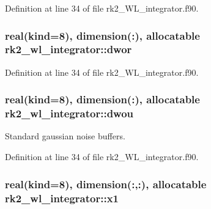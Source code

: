 Definition at line 34 of file rk2\+\_\+\+W\+L\+\_\+integrator.\+f90.

\subsubsection[{\texorpdfstring{dwor}{dwor}}]{\setlength{\rightskip}{0pt plus 5cm}real(kind=8), dimension(\+:), allocatable rk2\+\_\+wl\+\_\+integrator\+::dwor\hspace{0.3cm}{\ttfamily [private]}}\hypertarget{namespacerk2__wl__integrator_a94b90cb88115b2d39977de8b89909833}{}\label{namespacerk2__wl__integrator_a94b90cb88115b2d39977de8b89909833}


Definition at line 34 of file rk2\+\_\+\+W\+L\+\_\+integrator.\+f90.

\subsubsection[{\texorpdfstring{dwou}{dwou}}]{\setlength{\rightskip}{0pt plus 5cm}real(kind=8), dimension(\+:), allocatable rk2\+\_\+wl\+\_\+integrator\+::dwou\hspace{0.3cm}{\ttfamily [private]}}\hypertarget{namespacerk2__wl__integrator_a1e05e6efc7acdce81954944c134ac83b}{}\label{namespacerk2__wl__integrator_a1e05e6efc7acdce81954944c134ac83b}


Standard gaussian noise buffers. 



Definition at line 34 of file rk2\+\_\+\+W\+L\+\_\+integrator.\+f90.

\subsubsection[{\texorpdfstring{x1}{x1}}]{\setlength{\rightskip}{0pt plus 5cm}real(kind=8), dimension(\+:,\+:), allocatable rk2\+\_\+wl\+\_\+integrator\+::x1\hspace{0.3cm}{\ttfamily [private]}}\hypertarget{namespacerk2__wl__integrator_a5fd86898081b24e076b0830a5d1e9e51}{}\label{namespacerk2__wl__integrator_a5fd86898081b24e076b0830a5d1e9e51}


